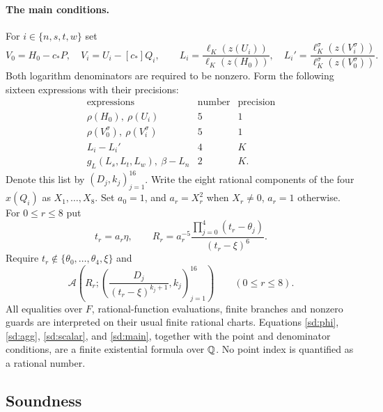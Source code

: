 \paragraph{The main conditions.}
For $i\in\{n,s,t,w\}$ set
\[
 V_0=H_0-c_*P,\quad V_i=U_i-[c_*]Q_i,\qquad
 L_i=\frac{\ell_K(z(U_i))}{\ell_K(z(H_0))},\quad
 L_i'=\frac{\ell_K^\sigma(z(V_i^\sigma))}
                    {\ell_K^\sigma(z(V_0^\sigma))}.
\]
Both logarithm denominators are required to be nonzero. Form the following
sixteen expressions with their precisions:
\begin{equation}\label{sd:list}
 \begin{array}{c|c|c}
 \text{expressions}&\text{number}&\text{precision}\\\hline
 \rho(H_0),\ \rho(U_i)&5&1\\
 \rho(V_0^\sigma),\ \rho(V_i^\sigma)&5&1\\
 L_i-L_i'&4&K\\
 g_L(L_s,L_t,L_w),\ \beta-L_n&2&K.
 \end{array}
\end{equation}
Denote this list by $(D_j,k_j)_{j=1}^{16}$.
Write the eight rational components of the four $x(Q_i)$ as $X_1,\ldots,X_8$.
Set $a_0=1$, and $a_r=X_r^2$ when $X_r\ne0$, $a_r=1$ otherwise.
For $0\le r\le8$ put
\[
 t_r=a_r\eta,\qquad
 R_r=a_r^{-5}\frac{\prod_{j=0}^4(t_r-\theta_j)}{(t_r-\xi)^6}.
\]
Require $t_r\notin\{\theta_0,\ldots,\theta_4,\xi\}$ and
\begin{equation}\label{sd:main}
 \mathcal A\left(R_r;
       \left(\frac{D_j}{(t_r-\xi)^{k_j+1}},k_j\right)_{j=1}^{16}\right)
 \qquad(0\le r\le8).
\end{equation}
All equalities over $F$, rational-function evaluations, finite branches and
nonzero guards are interpreted on their usual finite rational charts.
Equations \eqref{sd:phi}, \eqref{sd:agg}, \eqref{sd:scalar}, and
\eqref{sd:main}, together with the point and denominator conditions, are a
finite existential formula over $\mathbb Q$. No point index is quantified as a
rational number.

\subsection{Soundness}

